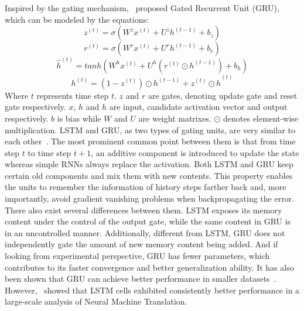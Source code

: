 Inspired by the gating mechanism,~ proposed Gated Recurrent Unit (GRU), which can be modeled by the equations:
\begin{equation}
z^{(t)} = \sigma\left(W^z x^{(t)} + U^{z} h^{(t-1)} + b_z\right)
\end{equation}
\begin{equation}
r^{(t)} = \sigma\left(W^r x^{(t)} + U^{r} h^{(t-1)} + b_r\right)
\end{equation}
\begin{equation}
\hat{h}^{(t)} = tanh\left(W^h x^{(t)} + U^{h} (r^{(t)} \odot h^{(t-1)}) + b_h\right)
\end{equation}
\begin{equation}
h^{(t)} = (1-z^{(t)})\odot h^{(t-1)} + z^{(t)} \odot \hat{h}^{(t)}
\end{equation}
Where $t$ represents time step $t$. $z$ and $r$ are gates, denoting update gate and reset gate respectively. $x$, $\hat{h}$ and $h$ are input, candidate activation vector and output respectively. $b$ is bias while $W$ and $U$ are weight matrixes. $\odot$ denotes element-wise multiplication. 
LSTM and GRU, as two types of gating units, are very similar to each other~. The most prominent common point between them is that from time step $t$ to time step $t+1$, an additive component is introduced to update the state whereas simple RNNs always replace the activation. Both LSTM and GRU keep certain old components and mix them with new contents. This property enables the units to remember the information of history steps farther back and, more importantly, avoid gradient vanishing problems when backpropagating the error. 
There also exist several differences between them. LSTM exposes its memory content under the control of the output gate, while the same content in GRU is in an uncontrolled manner. Additionally, different from LSTM, GRU does not independently gate the amount of new memory content being added. And if looking from experimental perspective, GRU has fewer parameters, which contributes to its faster convergence and better generalization ability. It has also been shown that GRU can achieve better performance in smaller datasets~. However,~ showed that LSTM cells exhibited consistently better performance in a large-scale analysis of Neural Machine Translation.


